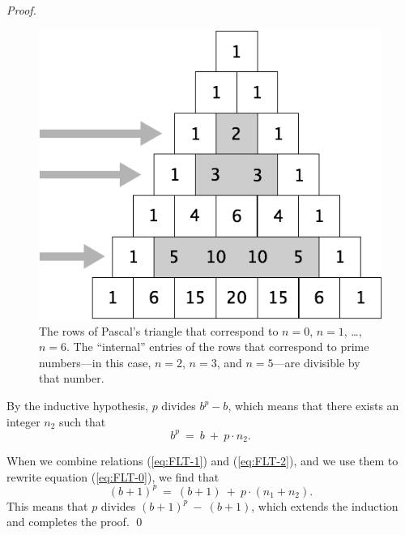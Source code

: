 \begin{proof}
\begin{figure}[ht]
\begin{center}
  \includegraphics[scale=0.3]{FiguresArithmetic/TrianglePascalPrimes.png}
\caption{The rows of Pascal's triangle that correspond to $n=0$,
  $n=1$, \ldots, $n=6$.  The ``internal'' entries of the rows that
  correspond to prime numbers---in this case, $n=2$, $n=3$, and $n=5$---are
  divisible by that number.}
\label{fig:TrianglePrime}
\end{center}
\end{figure}

By the inductive hypothesis, $p$ divides $b^p -b$, which means that
there exists an integer $n_2$ such that
\begin{equation}
\label{eq:FLT-2}
 b^p \ = \ b \ + \ p \cdot n_2.
\end{equation}

\smallskip

When we combine relations (\ref{eq:FLT-1}) and (\ref{eq:FLT-2}), and
we use them to rewrite equation (\ref{eq:FLT-0}), we find that
\[
(b+1)^p \ = \ (b + 1) \ + \ p \cdot (n_1 + n_2).
\]
This means that $p$ divides $(b+1)^p \ - \ (b + 1)$, which extends the
induction and completes the proof.
\qed
\end{proof}

